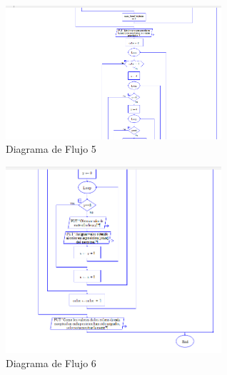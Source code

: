 \documentclass{article}
\begin{document}
  \begin{figure}[h]
    \includegraphics[width=8cm]{flow_5.png}
    \centering
    \caption{Diagrama de Flujo 5}
    \label{fig:flow_5}
 \end{figure}
  \begin{figure}[h]
    \includegraphics[width=8cm]{flow_6.png}
    \centering
    \caption{Diagrama de Flujo 6}
    \label{fig:flow_6}
 \end{figure}
\end{document}
